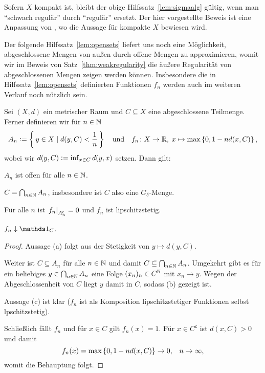 \documentclass[../main/main.tex]{subfiles}
\begin{document}
	\begin{Bemerkung}
		Sofern $X$ kompakt ist, bleibt der obige Hilfssatz~\ref{lem:sigmaalg} gültig, wenn man \enquote{schwach regulär} durch \enquote{regulär} ersetzt. Der hier vorgestellte Beweis ist eine Anpassung von \cite[Lemma 4.5.5]{Simon.2015}, wo die Aussage für kompakte $X$ bewiesen wird.
	\end{Bemerkung}

	Der folgende Hilfssatz~\ref{lem:opensets} liefert uns noch eine Möglichkeit, 
	abgeschlossene Mengen von außen durch offene Mengen zu approximieren, womit wir im 
	Beweis von Satz~\ref{thm:weakregularity} die äußere Regularität von abgeschlossenen 
	Mengen zeigen werden können. Insbesondere die in Hilfssatz~\ref{lem:opensets} definierten 
	Funktionen $f_n$ werden  auch im weiteren Verlauf noch nützlich sein.
	
	\begin{Hilfssatz}
		\label{lem:opensets}
		Sei $(X, d)$ ein metrischer Raum und $C \subseteq X$ eine abgeschlossene 
		Teilmenge. Ferner definieren wir für $n \in \mathbb{N}$
		$$ A_n \vcentcolon = \left\{\, y \in X \; | \; d(y, C) < \frac{1}{n} \,\right\} \quad \text{und} \quad 
		f_n \colon X \to \mathbb{R}, \; x \mapsto \max \left\{0, 1-n d(x, C)\right\}  \text{,}$$
		wobei wir $d(y, C) \vcentcolon = \inf_{x \in C} d(y, x)$ setzen.
		Dann gilt:
		\begin{enumeratethm}
			\item $A_n$ ist offen für alle $n \in \mathbb{N}$.
			\item $C = \bigcap_{n \in \mathbb{N}} A_n$, insbesondere ist $C$ also eine $G_\delta$-Menge.
			\item Für alle $n$ ist $\left.f_n\right|_{A_n^\mathsf{c}} = 0$ und $f_n$ ist lipschitzstetig.
			\item $f_n \convdown \indfct_C$.
		\end{enumeratethm}
	\end{Hilfssatz}

	\begin{proof}
		Aussage (a) folgt aus der Stetigkeit von $y \mapsto d(y, C)$.
		
		Weiter ist $C \subseteq A_n$ für alle $n \in \mathbb{N}$ und damit 
		$C \subseteq \bigcap_{n \in \mathbb{N}} A_n$. 
		Umgekehrt gibt es für ein beliebiges $y \in \bigcap_{n \in \mathbb{N}} A_n$
		eine Folge $(x_n)_n \in C^{\mathbb{N}}$ mit $x_n \rightarrow y$. 
		Wegen der Abgeschlossenheit von $C$ liegt $y$ damit in $C$, sodass (b) gezeigt ist.
		
		Aussage (c) ist klar ($f_n$ ist als Komposition lipschitzstetiger Funktionen selbst lpschitzstetig).
		
		Schließlich fällt $f_n$ und für $x \in C$ gilt $f_n(x) = 1$. Für $x \in C^\mathsf{c}$ ist $d(x, C) > 0$ und damit
		$$f_n(x) = \max \left\{0, 1-n d(x, C)\right\} \to 0 \text{,} \quad n \to \infty \text{,}$$
		womit die Behauptung folgt.
	\end{proof}
\end{document}
